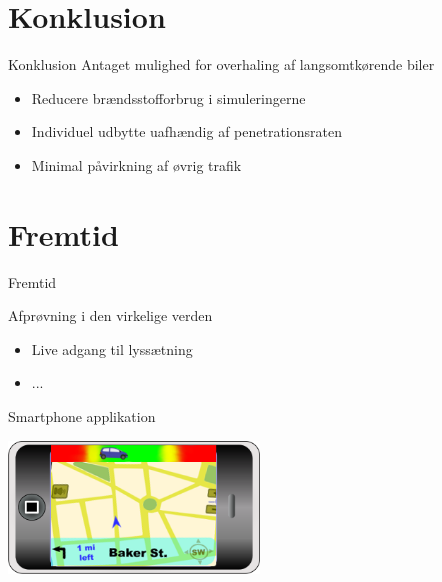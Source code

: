 \section{Konklusion}
\begin{frame}{Konklusion}
Antaget mulighed for overhaling af langsomtkørende biler
\begin{itemize}
\item Reducere brændsstofforbrug i simuleringerne
\item Individuel udbytte uafhændig af penetrationsraten
\item Minimal påvirkning af øvrig trafik
\end{itemize}
\end{frame}

\section{Fremtid}
\begin{frame}{Fremtid}

Afprøvning i den virkelige verden %
\begin{itemize}
\item Live adgang til lyssætning
\item ...
\end{itemize}

Smartphone applikation
\begin{center}
\includegraphics[width=0.5\textwidth]{images/product.png}
\end{center}
\end{frame}
